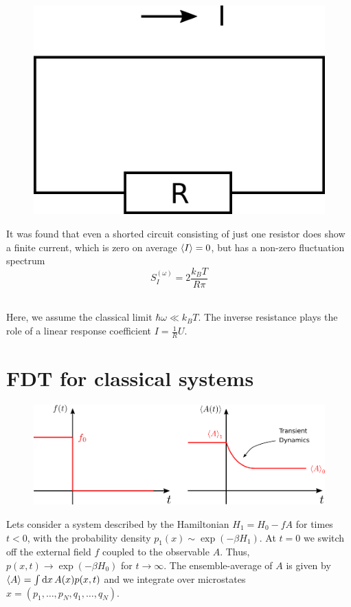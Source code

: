\documentclass{notebook}
\begin{document}
\begin{minipage}{0.4\linewidth}
	\begin{figure}[H]
		\centering
		\includegraphics[width=0.9\linewidth]{Pics/shortedcircuit}
		\label{fig:shortedcircuit}
	\end{figure}
\end{minipage}
%
\hspace*{0.05\linewidth}
%
\begin{minipage}{0.48\linewidth}
	It was found that even a shorted circuit consisting of just one resistor does show a finite current, which is zero on average $\expval{I} = 0$, but has a non-zero fluctuation spectrum
	\begin{equation}
	S_I^{(\omega)} = 2 \frac{k_B T}{R \pi}
	\end{equation}
\end{minipage}
%
\\ 

Here, we assume the classical limit $\hbar \omega \ll k_B T$. The inverse resistance plays the role of a linear response coefficient $I = \frac{1}{R} U$.


\newpage
\section{FDT for classical systems}

%
\begin{figure}[H]
	\centering
	\includegraphics[width=0.9\linewidth]{Pics/derivationFDT}
	\label{fig:derivationfdt}
\end{figure}
%
Lets consider a system described by the Hamiltonian $H_1 = H_0 - f A$ for times $t < 0$, with the probability density $p_1(x) \sim \exp(- \beta H_1)$. At $t = 0$ we switch off the external field $f$ coupled to the observable $A$. Thus, $p(x,t) \to \exp(-\beta H_0)$ for $t \to \infty$. The ensemble-average of $A$ is given by $\expval{A} = \int{\dd{x} A(x) p(x,t)}$ and we integrate over microstates $x = (p_1, \dots, p_N, q_1, \dots, q_N)$. 
\end{document}
